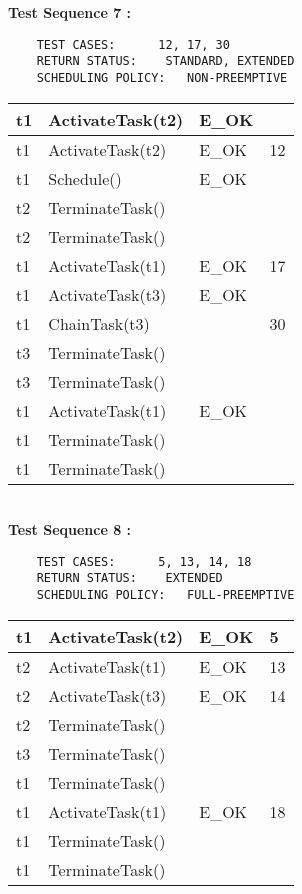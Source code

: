\documentclass[10pt]{article}
\newlength{\Li}\settowidth{\Li}{Running}
\newlength{\Lii}\setlength{\Lii}{7cm}
\newlength{\Liiii}\setlength{\Liiii}{0.9cm}
\newlength{\Liii}\setlength{\Liii}{\textwidth} \addtolength{\Liii}{-\Li} \addtolength{\Liii}{-\Lii} \addtolength{\Liii}{-\Liiii}
\begin{document}
	\textbf{Test Sequence 7 :}
	\begin{lstlisting}
	TEST CASES:		 12, 17, 30
	RETURN STATUS:	  STANDARD, EXTENDED
	SCHEDULING POLICY:   NON-PREEMPTIVE
	\end{lstlisting}
	

	\begin{supertabular}{|p{\Li}|p{\Lii}|p{\Liii}|p{\Liiii}|} \hline 	
	t1	& ActivateTask(t2)		& E\_OK	& \\ \hline
	t1	& ActivateTask(t2) 		& E\_OK	& 12 \\ \hline
	t1	& Schedule() 				& E\_OK	& \\ \hline
	t2	& TerminateTask() 			&		&\\ \hline
	t2	& TerminateTask() 			&		&\\ \hline
	t1	& ActivateTask(t1)		& E\_OK	& 17 \\ \hline
	t1	& ActivateTask(t3)		& E\_OK	& \\ \hline
	t1 	& ChainTask(t3) 		& 		& 30\\ \hline
	t3	& TerminateTask() 			&		&\\ \hline
	t3	& TerminateTask() 			&		&\\ \hline
	t1	& ActivateTask(t1)		& E\_OK	& \\ \hline
	t1	& TerminateTask() 			&		&\\ \hline
	t1	& TerminateTask() 			&		&\\ \hline
	\end{supertabular} \\

	\textbf{Test Sequence 8 :}
	\begin{lstlisting}
	TEST CASES:		 5, 13, 14, 18
	RETURN STATUS:	  EXTENDED
	SCHEDULING POLICY:   FULL-PREEMPTIVE
	\end{lstlisting}
	

	\begin{supertabular}{|p{\Li}|p{\Lii}|p{\Liii}|p{\Liiii}|} \hline 	
	t1	& ActivateTask(t2)		& E\_OK	& 5 \\ \hline
	t2	& ActivateTask(t1)		& E\_OK	& 13 \\ \hline
	t2	& ActivateTask(t3)		& E\_OK	& 14 \\ \hline
	t2	& TerminateTask() 			&		&\\ \hline
	t3	& TerminateTask() 			&		&\\ \hline
	t1	& TerminateTask() 			&		&\\ \hline
	t1	& ActivateTask(t1)		& E\_OK	& 18 \\ \hline
	t1	& TerminateTask() 			&		&\\ \hline
	t1	& TerminateTask() 			&		&\\ \hline
	\end{supertabular} \\
\end{document}
